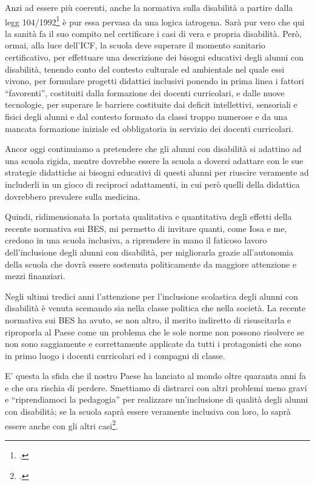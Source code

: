 Anzi ad essere più coerenti, anche la normativa sulla disabilità a partire dalla legg 104/1992\footcite{Legge_104_92} è pur essa pervasa da una logica iatrogena. Sarà pur vero che qui la sanità fa il suo compito nel certificare i casi di vera e propria disabilità. Però, ormai, alla luce dell'ICF, la scuola deve superare il momento sanitario certificativo, per effettuare una descrizione dei bisogni educativi degli alunni con disabilità, tenendo conto del contesto culturale ed ambientale nel quale essi vivono, per formulare progetti didattici inclusivi ponendo in prima linea i fattori “favorenti”, costituiti dalla formazione dei docenti curricolari, e dalle nuove tecnologie, per superare le barriere costituite dai deficit intellettivi, sensoriali e fisici degli alunni e dal contesto formato da classi troppo numerose e da una mancata formazione iniziale ed obbligatoria in servizio dei docenti curricolari.

Ancor oggi continuiamo a pretendere che gli alunni con disabilità si adattino ad una scuola rigida, mentre dovrebbe essere la scuola a doversi adattare con le sue strategie didattiche ai bisogni educativi di questi alunni per riuscire veramente ad includerli in un gioco di reciproci adattamenti, in cui però quelli della didattica dovrebbero prevalere sulla medicina.

Quindi, ridimensionata la portata qualitativa e quantitativa degli effetti della recente normativa sui BES, mi permetto di invitare quanti, come Iosa e me, credono in una scuola inclusiva, a riprendere in mano il faticoso lavoro dell'inclusione degli alunni con disabilità, per migliorarla grazie all'autonomia della scuola che dovrà essere sostenuta politicamente da maggiore attenzione e mezzi finanziari.

Negli ultimi tredici anni l'attenzione per l'inclusione scolastica degli alunni con disabilità è venuta scemando sia nella classe politica che nella società. La recente normativa sui BES ha avuto, se non altro, il merito indiretto di risuscitarla e riproporla al Paese come un problema che le sole norme non possono risolvere se non sono saggiamente e correttamente applicate da tutti i protagonisti che sono in primo luogo i docenti curricolari ed i compagni di classe.

E’ questa la sfida che il nostro Paese ha lanciato al mondo oltre quaranta anni fa e che ora rischia di perdere. Smettiamo di distrarci con altri problemi meno gravi e “riprendiamoci la pedagogia” per realizzare un'inclusione di qualità degli alunni con disabilità; se la scuola saprà essere veramente inclusiva con loro, lo saprà essere anche con gli altri casi\footcite{Nocera2013b}.